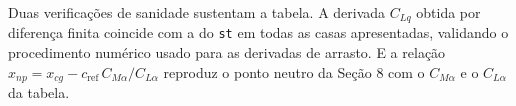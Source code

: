 Duas verificações de sanidade sustentam a tabela. A derivada $C_{Lq}$
obtida por diferença finita coincide com a do \texttt{st} em todas as
casas apresentadas, validando o procedimento numérico usado para as
derivadas de arrasto. E a relação $x_{np} = x_{cg} -
c_{\mathrm{ref}}\,C_{M\alpha}/C_{L\alpha}$ reproduz o ponto neutro da
Seção 8 com o $C_{M\alpha}$ e o $C_{L\alpha}$ da tabela.
